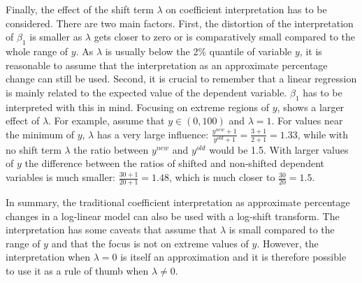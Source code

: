 Finally, the effect of the shift term $\lambda$ on coefficient interpretation has to be considered.
There are two main factors.
First, the distortion of the interpretation of $\beta_1$ is smaller as $\lambda$ gets closer to zero or is comparatively small compared to the whole range of $y$.
As $\lambda$ is usually below the 2\% quantile of variable $y$, it is reasonable to assume that the interpretation as an approximate percentage change can still be used.
Second, it is crucial to remember that a linear regression is mainly related to the expected value of the dependent variable.
$\beta_1$ has to be interpreted with this in mind.
Focusing on extreme regions of $y$, shows a larger effect of $\lambda$.
For example, assume that $y \in (0, 100)$ and $\lambda = 1$.
For values near the minimum of $y$, $\lambda$ has a very large influence: $\frac{y^{new} + 1 } {y^{old} + 1} = \frac{3 + 1}  {2 + 1} = 1.33$, while with no shift term $\lambda$ the ratio between $y^{new}$ and $y^{old}$ would be 1.5. With larger values of $y$ the difference between the ratios of shifted and non-shifted dependent variables is much smaller: $\frac{30 + 1}{20 + 1} = 1.48$, which is much closer to $\frac{30}{20} = 1.5$.

In summary, the traditional coefficient interpretation as approximate percentage changes in a log-linear model can also be used with a log-shift transform.
The interpretation has some caveats that assume that $\lambda$ is small compared to the range of $y$ and that the focus is not on extreme values of $y$.
However, the interpretation when $\lambda = 0$ is itself an approximation and it is therefore possible to use it as a rule of thumb when $\lambda \ne 0$.